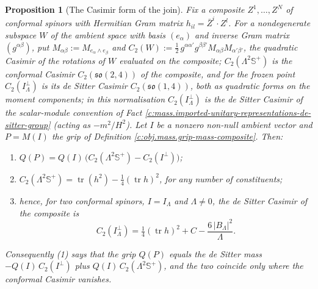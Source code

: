 \documentclass[11pt]{article}
\newtheorem{proposition}[theorem]{Proposition}
\theoremstyle{definition}
\theoremstyle{plain}
\newcommand{\changedmark}[2]{\marginpar{\raggedright\scriptsize\color{#1}#2}}
\providecommand{\CS}{}\renewcommand{\CS}{{\mathbb{S}^{+}}}
\providecommand{\tr}{}\renewcommand{\tr}{\operatorname{tr}}
\begin{document}
\begin{proposition}[The Casimir form of the join]\label{c:mass.casimir-form-join}
\changedmark{BrickRed}{corrected since the deposit}
Fix a composite $Z^{1}, \dots, Z^{N}$ of conformal spinors with Hermitian Gram matrix $h_{il} = \bar{Z}^{i}\cdot Z^{l}$. For a nondegenerate subspace $W$ of the ambient space with basis $(e_{\alpha})$ and inverse Gram matrix $(g^{\alpha\beta})$, put $M_{\alpha\beta} := M_{e_{\alpha}\wedge e_{\beta}}$ and $C_{2}(W) := \tfrac12\, g^{\alpha\alpha'}g^{\beta\beta'}M_{\alpha\beta}M_{\alpha'\beta'}$, the quadratic Casimir of the rotations of $W$ evaluated on the composite; $C_{2}(\Lambda^{2}\CS)$ is the conformal Casimir $C_{2}(\mathfrak{so}(2,4))$ of the composite, and for the frozen point $C_{2}(I_{\Lambda}^{\perp})$ is its de Sitter Casimir $C_{2}(\mathfrak{so}(1,4))$, both as quadratic forms on the moment components; in this normalisation $C_{2}(I_{\Lambda}^{\perp})$ is the de Sitter Casimir of the scalar-module convention of Fact \ref{c:mass.imported-unitary-representations-de-sitter-group} (acting as $-m^{2}/H^{2}$). Let $I$ be a nonzero non-null ambient vector and $P = M(I)$ the grip of Definition \ref{c:obj.mass.grip-mass-composite}. Then:
\begin{enumerate}
\item $Q(P) = Q(I)\,\bigl(C_{2}(\Lambda^{2}\CS) - C_{2}(I^{\perp})\bigr)$;
\item $C_{2}(\Lambda^{2}\CS) = \tr(h^{2}) - \tfrac14(\tr h)^{2}$, for any number of constituents;
\item hence, for two conformal spinors, $I = I_{\Lambda}$ and $\Lambda \neq 0$, the de Sitter Casimir of the composite is
\[
C_{2}(I_{\Lambda}^{\perp}) = \tfrac14(\tr h)^{2} + C - \frac{6\,|B_{\Lambda}|^{2}}{\Lambda}.
\]
\end{enumerate}
Consequently (1) says that the grip $Q(P)$ equals the de Sitter mass $-Q(I)\,C_{2}(I^{\perp})$ plus $Q(I)\,C_{2}(\Lambda^{2}\CS)$, and the two coincide only where the conformal Casimir vanishes.
\end{proposition}
\end{document}
